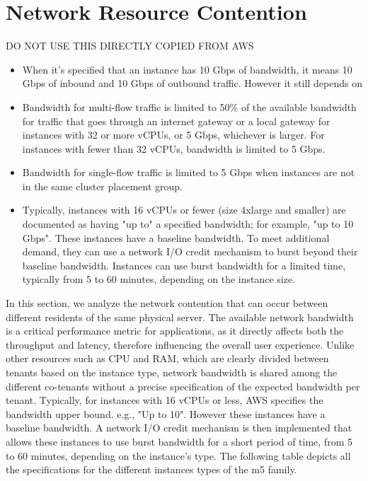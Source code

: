 \chapter{Network Resource Contention}\label{chapter:network}
DO NOT USE THIS DIRECTLY COPIED FROM AWS
\begin{itemize}
    \item When it's specified that an instance has 10 Gbps of bandwidth, it means 10 Gbps of inbound and 10 
    Gbps of outbound traffic. However it still depends on 
    \item Bandwidth for multi-flow traffic is limited to 50\% of the available bandwidth for 
    traffic that goes through an internet gateway or a local gateway for instances with 32 or 
    more vCPUs, or 5 Gbps, whichever is larger. For instances with fewer than 32 vCPUs, bandwidth 
    is limited to 5 Gbps.
    \item Bandwidth for single-flow traffic is limited to 5 Gbps when instances are not in the same 
    cluster placement group.
    \item Typically, instances with 16 vCPUs or fewer (size 4xlarge and smaller) are documented as having 
    "up to" a specified bandwidth; for example, "up to 10 Gbps". These instances have a baseline 
    bandwidth. To meet additional demand, they can use a network I/O credit mechanism to burst 
    beyond their baseline bandwidth. Instances can use burst bandwidth for a limited time, typically 
    from 5 to 60 minutes, depending on the instance size.
\end{itemize}
\noindent
In this section, we analyze the network contention that can occur between different residents of the same 
physical server. The available network bandwidth is a critical performance metric for applications, as it 
directly affects both the throughput and latency, therefore influencing the overall user experience. 
Unlike other resources such as CPU and RAM, which are clearly divided between tenants based on the instance 
type, network bandwidth is shared among the different co-tenants without a precise specification of the 
expected bandwidth per tenant. Typically, for instances with 16 vCPUs or less, AWS specifies the bandwidth 
upper bound. e.g., "Up to 10". However these instances have a baseline bandwidth. A network I/O credit 
mechanism is then implemented that allows these instances to use burst bandwidth for a short period of time, 
from 5 to 60 minutes, depending on the instance's type. The following table depicts all the specifications 
for the different instances types of the m5 family.
